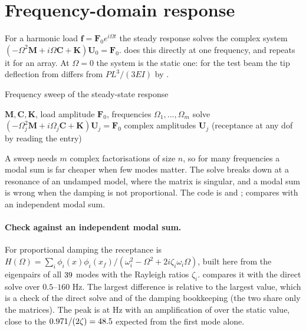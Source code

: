 \section{Frequency-domain response}\label{sec:dy-freq}

For a harmonic load $\bm f=\bm F_0e^{i\Omega t}$ the steady response solves the complex system $(-\Omega^2\bm M+i\Omega\bm C+\bm K)\bm U_0=\bm F_0$.  does this directly at one frequency, and  repeats it for an array. At $\Omega=0$ the system is the static one: for the test beam the tip deflection from  differs from $PL^3/(3EI)$ by \cdyHarmZeroErr.

\begin{algbox}{Frequency sweep of the steady-state response}
\begin{pseudo}
\Require $\bm M,\bm C,\bm K$, load amplitude $\bm F_0$, frequencies $\Omega_1,\dots,\Omega_m$
  \State solve $(-\Omega_j^2\bm M+i\Omega_j\bm C+\bm K)\bm U_j=\bm F_0$ 
\EndFor
\Ensure complex amplitudes $\bm U_j$ (receptance at any dof by reading the entry)
\end{pseudo}
\end{algbox}

A sweep needs $m$ complex factorisations of size $n$, so for many frequencies a modal sum is far cheaper when few modes matter. The solve breaks down at a resonance of an undamped model, where the matrix is singular, and a modal sum is wrong when the damping is not proportional. The code is  and ;  compares with an independent modal sum.

\paragraph{Check against an independent modal sum.}
For proportional damping the receptance is $H(\Omega)=\sum_i\phi_i(x)\phi_i(x_f)/(\omega_i^2-\Omega^2+2i\zeta_i\omega_i\Omega)$, built here from the eigenpairs of all $39$ modes with the Rayleigh ratios $\zeta_i$.  compares it with the direct solve over $0.5$--$160$ Hz. The largest difference is \cdyHarmDiff{} relative to the largest value, which is a check of the direct solve and of the damping bookkeeping (the two share only the matrices). The peak is at \cdyHarmPeakHz{} Hz with an amplification of \cdyHarmAmp{} over the static value, close to the $0.971/(2\zeta)=48.5$ expected from the first mode alone.


